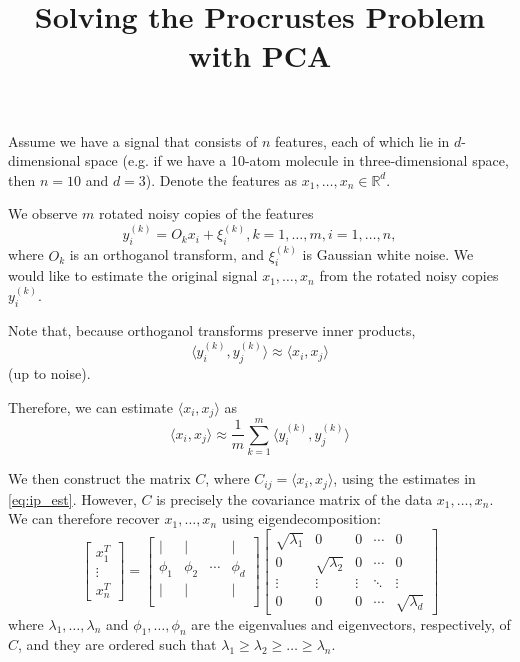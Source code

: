 \documentclass[12pt]{article}
\title{Solving the Procrustes Problem with PCA}
\begin{document}
\maketitle

Assume we have a signal that consists of $n$ features, each of which lie in $d$-dimensional space (e.g. if we have a 10-atom molecule in three-dimensional space, then $n=10$ and $d=3$).
%
Denote the features as $x_1, \dots, x_n \in \mathbb{R}^d$. 

We observe $m$ rotated noisy copies of the features
\begin{equation}
y_i^{(k)} = O_k x_i + \xi_i^{(k)}, k=1, \dots, m, i=1, \dots, n,
\end{equation}
where $O_k$ is an orthoganol transform, and $\xi_i^{(k)}$ is Gaussian white noise. 
%
We would like to estimate the original signal $x_1, \dots, x_n$ from the rotated noisy copies $y_i^{(k)}$.

Note that, because orthoganol transforms preserve inner products,
\begin{equation}
\langle y_i^{(k)}, y_j^{(k)} \rangle  \approx \langle x_i, x_j \rangle 
\end{equation}
(up to noise).

Therefore,  we can estimate $\langle x_i, x_j \rangle$ as 
\begin{equation} \label{eq:ip_est}
\langle x_i, x_j \rangle  \approx \frac{1}{m} \sum_{k=1}^m \langle y_i^{(k)}, y_j^{(k)} \rangle 
\end{equation}

We then construct the matrix $C$, where $C_{ij} = \langle x_i, x_j \rangle$, using the estimates in \eqref{eq:ip_est}.
%
However, $C$ is precisely the covariance matrix of the data $x_1, \dots, x_n$. 
%
We can therefore recover $x_1, \dots, x_n$ using eigendecomposition:
\begin{equation}
\begin{bmatrix}
x_1^T \\
\vdots \\
x_n^T 
\end{bmatrix} = 
\begin{bmatrix}
| & | &  & | \\
\phi_1 & \phi_2 & \cdots & \phi_d \\
| & | &  & | \\
\end{bmatrix}
\begin{bmatrix}
\sqrt{\lambda_1} & 0 & 0 & \cdots & 0 \\
0 & \sqrt{\lambda_2} & 0 & \cdots & 0 \\
\vdots & \vdots & \vdots & \ddots & \vdots \\
0 & 0 & 0 & \cdots & \sqrt{\lambda_d} 
\end{bmatrix}
\end{equation}
where $\lambda_1, \dots, \lambda_n$ and $\phi_1, \dots, \phi_n$ are the eigenvalues and eigenvectors, respectively, of $C$, and they are ordered such that $\lambda_1 \ge \lambda_2 \ge \dots \ge \lambda_n$. 
\end{document}
